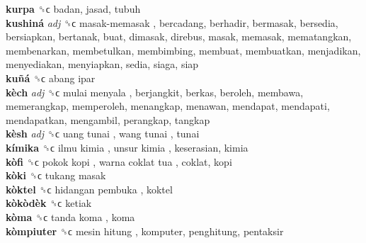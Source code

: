 \textbf{kurpa} ␝ϲ  badan, jasad, tubuh  \\
\textbf{kushiná} \emph{adj}  ␝ϲ   masak-memasak , bercadang, berhadir, bermasak, bersedia, bersiapkan, bertanak, buat, dimasak, direbus, masak, memasak, mematangkan, membenarkan, membetulkan, membimbing, membuat, membuatkan, menjadikan, menyediakan, menyiapkan, sedia, siaga, siap  \\
\textbf{kuñá} ␝ϲ   abang ipar   \\
\textbf{kèch} \emph{adj}  ␝ϲ   mulai menyala , berjangkit, berkas, beroleh, membawa, memerangkap, memperoleh, menangkap, menawan, mendapat, mendapati, mendapatkan, mengambil, perangkap, tangkap  \\
\textbf{kèsh} \emph{adj}  ␝ϲ   uang tunai ,  wang tunai , tunai  \\
\textbf{kímika} ␝ϲ   ilmu kimia ,  unsur kimia , keserasian, kimia  \\
\textbf{kòfi} ␝ϲ   pokok kopi ,  warna coklat tua , coklat, kopi  \\
\textbf{kòki} ␝ϲ   tukang masak   \\
\textbf{kòktel} ␝ϲ   hidangan pembuka , koktel  \\
\textbf{kòkòdèk} ␝ϲ  ketiak  \\
\textbf{kòma} ␝ϲ   tanda koma , koma  \\
\textbf{kòmpiuter} ␝ϲ   mesin hitung , komputer, penghitung, pentaksir  \\
